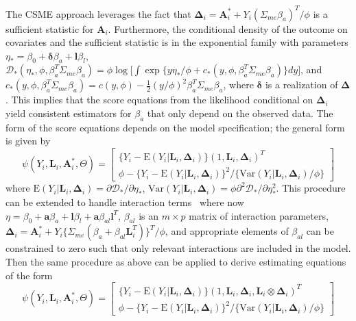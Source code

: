 \documentclass[useAMS,usenatbib,referee]{biom}
\begin{document}
The CSME approach leverages the fact that $\bm{\Delta}_{i} = \bm{A}^{*}_{i} + Y_{i}(\Sigma_{me}\beta_{a})^{T}/\phi$ is a sufficient statistic for $\bm{A}_{i}$. Furthermore, the conditional density of the outcome on covariates and the sufficient statistic is in the exponential family with parameters $\eta_{*} = \beta_{0} + \bm{\delta}\beta_{a} + \bm{l}\beta_{l}$, $\mathcal{D}_{*}(\eta_{*}, \phi, \beta_{a}^{T}\Sigma_{me}\beta_{a}) = \phi \log \bigg[ \int \exp \{ y\eta_{*}/\phi + c_{*}(y, \phi,  \beta_{a}^{T}\Sigma_{me}\beta_{a}) \} dy \bigg]$, and $c_{*}(y, \phi, \beta_{a}^{T}\Sigma_{me}\beta_{a}) = c(y, \phi) - \frac{1}{2}(y/\phi)^{2}\beta_{a}^{T}\Sigma_{me}\beta_{a}$, where $\bm{\delta}$ is a realization of $\bm{\Delta}$. This implies that the score equations from the likelihood conditional on $\bm{\Delta}_{i}$ yield consistent estimators for $\beta_{a}$ that only depend on the observed data. The form of the score equations depends on the model specification; the general form is given by
\begin{equation}
    \psi(Y_{i}, \bm{L}_{i}, \bm{A}^{*}_{i}, \Theta) =
    \begin{bmatrix}
       \{ Y_{i} - \text{E}(Y_{i} | \bm{L}_{i}, \bm{\Delta}_{i}) \} (1, \bm{L}_{i}, \bm{\Delta}_{i})^{T} \\
        \phi - \{ Y_{i} - \text{E}(Y_{i} | \bm{L}_{i}, \bm{\Delta}_{i}) \}^{2} / \{ \text{Var}(Y_{i} | \bm{L}_{i}, \bm{\Delta}_{i}) / \phi \}
    \end{bmatrix}
\end{equation}
where $\text{E}(Y_{i} | \bm{L}_{i}, \bm{\Delta}_{i}) = \partial \mathcal{D}_{*} / \partial \eta_{*}$, $\text{Var}(Y_{i} | \bm{L}_{i}, \bm{\Delta}_{i}) = \phi \partial^{2} \mathcal{D}_{*} / \partial \eta^{2}_{*}$. This procedure can be extended to handle interaction terms~\citep{dagalp2001} where now $\eta = \beta_{0} + \bm{a}\beta_{a} + \bm{l}\beta_{l} + \bm{a}\beta_{al}\bm{l}^{T}$, $\beta_{al}$ is an $m \times p$ matrix of interaction parameters, $\bm{\Delta}_{i} = \bm{A}_{i}^{*} + Y_{i}\{ \Sigma_{me}(\beta_{a} + \beta_{al}\bm{L}_{i}^{T}) \}^{T}/\phi$, and appropriate elements of $\beta_{al}$ can be constrained to zero such that only relevant interactions are included in the model. Then the same procedure as above can be applied to derive estimating equations of the form
\begin{equation*}
    \psi(Y_{i}, \bm{L}_{i}, \bm{A}^{*}_{i}, \Theta) =
    \begin{bmatrix}
       \{ Y_{i} - \text{E}(Y_{i} | \bm{L}_{i}, \bm{\Delta}_{i}) \} (1, \bm{L}_{i}, \bm{\Delta}_{i}, \bm{L}_{i} \otimes \bm{\Delta}_{i})^{T} \\
        \phi - \{ Y_{i} - \text{E}(Y_{i} | \bm{L}_{i}, \bm{\Delta}_{i}) \}^{2} / \{ \text{Var}(Y_{i} | \bm{L}_{i}, \bm{\Delta}_{i}) / \phi \}
    \end{bmatrix}
\end{equation*}
\end{document}
